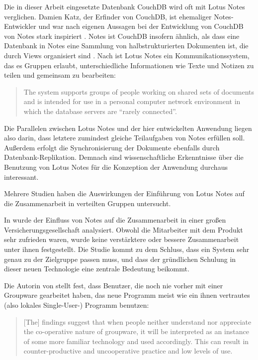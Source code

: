 Die in dieser Arbeit eingesetzte Datenbank CouchDB wird oft mit Lotus Notes verglichen. Damien Katz, der Erfinder von CouchDB, ist ehemaliger Notes-Entwickler und war nach eigenen Aussagen bei der Entwicklung von CouchDB von Notes stark inspiriert \cite{lotusnotes:interview}. Notes ist CouchDB insofern ähnlich, als dass eine Datenbank in Notes eine Sammlung von halbstrukturierten Dokumenten ist, die durch Views organisiert sind . Nach  ist Lotus Notes ein Kommunikationssystem, das es Gruppen erlaubt, unterschiedliche Informationen wie Texte und Notizen zu teilen und gemeinsam zu bearbeiten:

\begin{quote}
The system supports groups of people working on shared sets of documents and is intended for use in a personal computer network environment in which the database servers are \enquote{rarely connected}. 
\end{quote}

Die Parallelen zwischen Lotus Notes und der hier entwickelten Anwendung liegen also darin, dass letztere zumindest gleiche Teilaufgaben von Notes erfüllen soll. Außerdem erfolgt die Synchronisierung der Dokumente ebenfalls durch Datenbank-Replikation. Demnach sind wissenschaftliche Erkenntnisse über die Benutzung von Lotus Notes für die Konzeption der Anwendung durchaus interessant.

Mehrere Studien haben die Auswirkungen der Einführung von Lotus Notes auf die Zusammenarbeit in verteilten Gruppen untersucht.  

In  wurde der Einfluss von Notes auf die Zusammenarbeit in einer großen Versicherungsgesellschaft analysiert. Obwohl die Mitarbeiter mit dem Produkt sehr zufrieden waren, wurde keine verstärktere oder bessere Zusammenarbeit unter ihnen festgestellt. Die Studie kommt zu dem Schluss, dass ein System sehr genau zu der Zielgruppe passen muss, und dass der gründlichen Schulung in dieser neuen Technologie eine zentrale Bedeutung beikommt.

Die Autorin von  stellt fest, dass Benutzer, die noch nie vorher mit einer Groupware gearbeitet haben, das neue Programm meist wie ein ihnen vertrautes (also lokales Single-User-) Programm benutzen:

\begin{quote}
[The] findings suggest that when people neither understand nor appreciate the co-operative nature of groupware, it will be interpreted as an instance of some more familiar technology and used accordingly. This can result in counter-productive and uncooperative practice and low levels of use.  
\end{quote}

